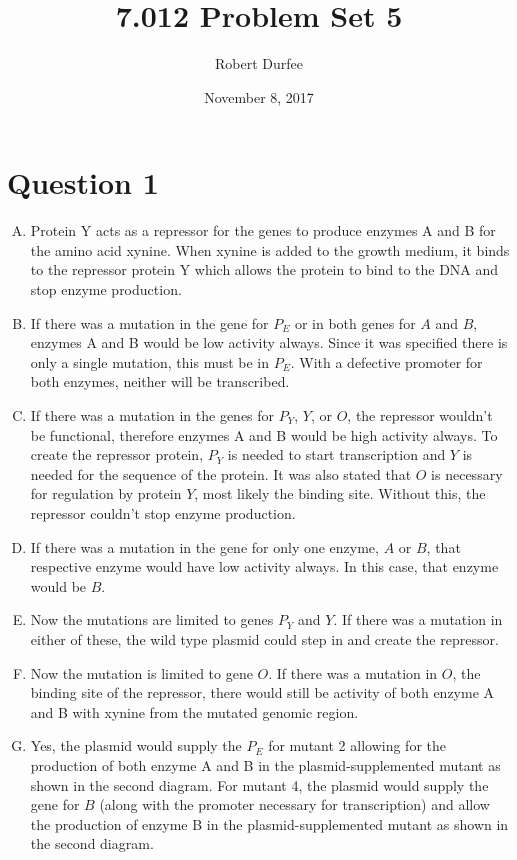 \documentclass{article}
\title{7.012 Problem Set 5}
\author{Robert Durfee}
\date{November 8, 2017}
\begin{document}
\maketitle

\section*{Question 1}

\begin{enumerate}[A.]
    \item Protein Y acts as a repressor for the genes to produce enzymes A and B for the amino acid xynine. When xynine is added to the growth medium, it binds to the repressor protein Y which allows the protein to bind to the DNA and stop enzyme production.
    
    \item If there was a mutation in the gene for $P_{E}$ or in both genes for $A$ and $B$, enzymes A and B would be low activity always. Since it was specified there is only a single mutation, this must be in $P_{E}$. With a defective promoter for both enzymes, neither will be transcribed.
    
    \item If there was a mutation in the genes for $P_{Y}$, $Y$, or $O$, the repressor wouldn't be functional, therefore enzymes A and B would be high activity always. To create the repressor protein, $P_{Y}$ is needed to start transcription and $Y$ is needed for the sequence of the protein. It was also stated that $O$ is necessary for regulation by protein $Y$, most likely the binding site. Without this, the repressor couldn't stop enzyme production.
    
    \item If there was a mutation in the gene for only one enzyme, $A$ or $B$, that respective enzyme would have low activity always. In this case, that enzyme would be $B$.
    
    \item Now the mutations are limited to genes $P_{Y}$ and $Y$. If there was a mutation in either of these, the wild type plasmid could step in and create the repressor. 
    
    \item Now the mutation is limited to gene $O$. If there was a mutation in $O$, the binding site of the repressor, there would still be activity of both enzyme A and B with xynine from the mutated genomic region.
    
    \item Yes, the plasmid would supply the $P_{E}$ for mutant 2 allowing for the production of both enzyme A and B in the plasmid-supplemented mutant as shown in the second diagram. For mutant 4, the plasmid would supply the gene for $B$ (along with the promoter necessary for transcription) and allow the production of enzyme B in the plasmid-supplemented mutant as shown in the second diagram.
    
\end{enumerate}
\end{document}

